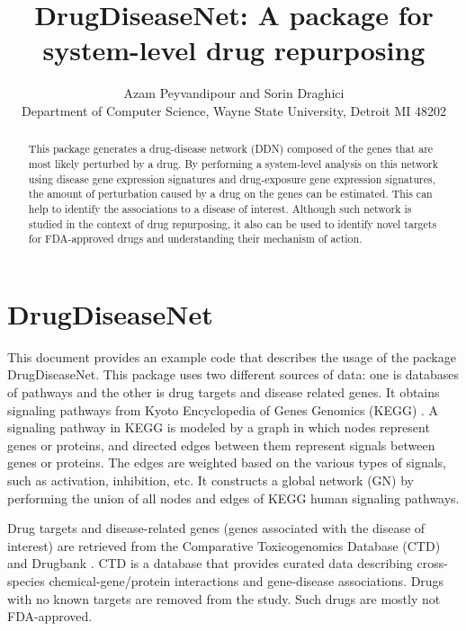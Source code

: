 \documentclass[11pt]{article}
\begin{document}
\title{DrugDiseaseNet: A package for system-level drug repurposing}
\author{Azam Peyvandipour and Sorin Draghici\\
Department of Computer Science, Wayne State University, Detroit MI 48202}
\maketitle

\begin{abstract}
This package generates a drug-disease network (DDN)
composed of the genes that are most likely perturbed
by a drug. By performing a system-level analysis on this
network using disease gene expression signatures and
drug-exposure gene expression signatures, the amount
of perturbation caused by a drug on the genes can be
estimated. This can help to identify the associations to
a disease of interest. Although such network is studied
in the context of drug repurposing, it also can be used
to identify novel targets for FDA-approved drugs and
understanding their mechanism of action.

\end{abstract}

\section{DrugDiseaseNet}
This document provides an example code that describes
the usage of the package DrugDiseaseNet. This package
uses two different sources of data: one is databases of
pathways and the other is drug targets and disease
related genes. It obtains signaling pathways
from Kyoto Encyclopedia of Genes Genomics (KEGG) \cite{kegg}.
A signaling pathway in KEGG is modeled by a graph in
which nodes represent genes or proteins, and directed
edges between them represent signals between genes
or proteins. The edges are weighted based on the various
types of signals, such as activation, inhibition, etc.
It constructs a global network (GN) by performing
the union of all nodes and edges of KEGG human
signaling pathways.

Drug targets and disease-related genes
(genes associated with the disease of interest)
are retrieved from the Comparative Toxicogenomics
Database (CTD) \cite{mattingly2006comparative}
and Drugbank \cite{wishart2006drugbank}.
CTD is a database that provides curated data describing
cross-species chemical-gene/protein interactions and
gene-disease associations. Drugs with no known targets
are removed from the study. Such drugs are mostly not
FDA-approved.
\end{document}
